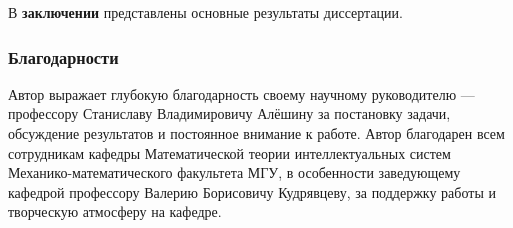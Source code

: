 В {\bf заключении} представлены основные результаты диссертации.

\subsubsection*{Благодарности}
Автор выражает глубокую благодарность своему научному руководителю ---
профессору Станиславу Владимировичу Алёшину за постановку задачи,
обсуждение результатов и постоянное внимание к работе.
Автор благодарен всем сотрудникам кафедры Математической теории
интеллектуальных систем Механико-математического факультета МГУ,
в особенности заведующему кафедрой профессору Валерию Борисовичу \mbox{Кудрявцеву},
за поддержку работы и творческую атмосферу на кафедре.

